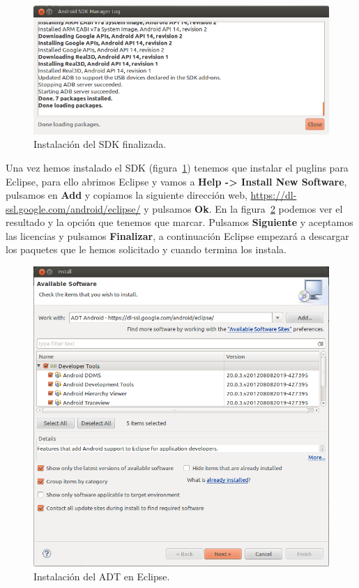 \begin{figure}
  \centering
    \includegraphics[scale=0.6]{./ConfiguracionEclipse/imagenes/SDKfinalizado.png}
  \caption{Instalación del SDK finalizada.}
  \label{fig:SDKfinalizado}
\end{figure}

Una vez hemos instalado el SDK (figura~\ref{fig:SDKfinalizado}) tenemos que instalar el puglins para Eclipse, para ello abrimos Eclipse y vamos a \textbf{Help -> Install New Software}, pulsamos en \textbf{Add} y copiamos la siguiente dirección web, \url{https://dl-ssl.google.com/android/eclipse/} y pulsamos \textbf{Ok}. En la figura~\ref{fig:instalacionADT} podemos ver el resultado y la opción que tenemos que marcar. Pulsamos \textbf{Siguiente} y aceptamos las licencias y pulsamos \textbf{Finalizar}, a continuación Eclipse empezará a descargar los paquetes que le hemos solicitado y cuando termina los instala.

\begin{figure}
  \centering
    \includegraphics[scale=0.6]{./ConfiguracionEclipse/imagenes/instalacionADT.png}
  \caption{Instalación del ADT en Eclipse.}
  \label{fig:instalacionADT}
\end{figure}

